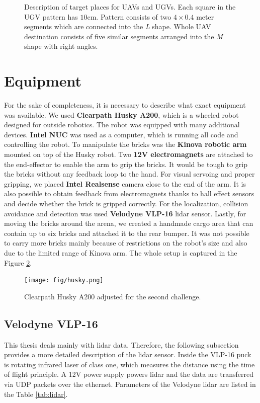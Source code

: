 \begin{figure}[H]
\caption[Brick destinations]{Description of target places for UAVs and UGVs. Each square in the UGV pattern has $10$cm. Pattern consists of two $4\times0.4$ meter segments which are connected into the \textit{L} shape. Whole UAV destination consists of five similar segments arranged into the \textit{M} shape with right angles.}
\label{fig:dest}
\end{figure}


\section{Equipment}
For the sake of completeness, it is necessary to describe what exact equipment was available. We used \textbf{Clearpath Husky A200}, which is a wheeled robot designed for outside robotics. The robot was equipped with many additional devices. \textbf{Intel NUC} was used as a computer, which is running all code and controlling the robot. To manipulate the bricks was the \textbf{Kinova robotic arm} mounted on top of the Husky robot. Two \textbf{12V electromagnets} are attached to the end-effector to enable the arm to grip the bricks. It would be tough to grip the bricks without any feedback loop to the hand. For visual servoing and proper gripping, we placed \textbf{Intel Realsense} camera close to the end of the arm. It is also possible to obtain feedback from electromagnets thanks to hall effect sensors and decide whether the brick is gripped correctly. For the localization, collision avoidance and detection was used \textbf{Velodyne VLP-16} lidar sensor. Lastly, for moving the bricks around the arena, we created a handmade cargo area that can contain up to six bricks and attached it to the rear bumper. It was not possible to carry more bricks mainly because of restrictions on the robot's size and also due to the limited range of Kinova arm. The whole setup is captured in the Figure \ref{fig:husky}.

\begin{figure}[H]
\centering
\texttt{[image: fig/husky.png]}
\caption[UGV robot setup]{Clearpath Husky A200 adjusted for the second challenge.}
\label{fig:husky}

\end{figure}

\subsection{Velodyne VLP-16}
This thesis deals mainly with lidar data. Therefore, the following subsection provides a more detailed description of the lidar sensor. Inside the VLP-16 puck is rotating infrared laser of class one, which measures the distance using the time of flight principle. A 12V power supply powers lidar and the data are transferred via UDP packets over the ethernet. Parameters of the Velodyne lidar are listed in the Table \ref{tab:lidar}.

